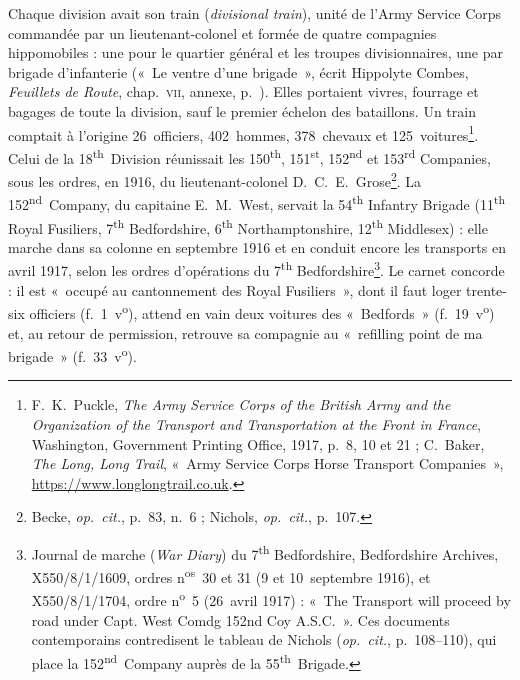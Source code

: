 Chaque division avait son train (\textit{divisional train}), unité de l'Army Service Corps commandée par un lieutenant-colonel et formée de quatre compagnies hippomobiles : une pour le quartier général et les troupes divisionnaires, une par brigade d'infanterie («~Le ventre d'une brigade~», écrit Hippolyte Combes, \textit{Feuillets de Route}, chap.~\textsc{vii}, annexe, p.~\pageref{annexe:doc6-vii}). Elles portaient vivres, fourrage et bagages de toute la division, sauf le premier échelon des bataillons. Un train comptait à l'origine 26~officiers, 402~hommes, 378~chevaux et 125~voitures\footnote{F.~K.~Puckle, \textit{The Army Service Corps of the British Army and the Organization of the Transport and Transportation at the Front in France}, Washington, Government Printing Office, 1917, p.~8, 10 et 21 ; C.~Baker, \textit{The Long, Long Trail}, «~Army Service Corps Horse Transport Companies~», \url{https://www.longlongtrail.co.uk}.}. Celui de la 18\textsuperscript{th}~Division réunissait les 150\textsuperscript{th}, 151\textsuperscript{st}, 152\textsuperscript{nd} et 153\textsuperscript{rd} Companies, sous les ordres, en 1916, du lieutenant-colonel D.~C.~E.~Grose\footnote{Becke, \textit{op.~cit.}, p.~83, n.~6 ; Nichols, \textit{op.~cit.}, p.~107.}. La 152\textsuperscript{nd}~Company, du capitaine E.~M.~West, servait la 54\textsuperscript{th} Infantry Brigade (11\textsuperscript{th} Royal Fusiliers, 7\textsuperscript{th} Bedfordshire, 6\textsuperscript{th} Northamptonshire, 12\textsuperscript{th} Middlesex) : elle marche dans sa colonne en septembre 1916 et en conduit encore les transports en avril 1917, selon les ordres d'opérations du 7\textsuperscript{th} Bedfordshire\footnote{Journal de marche (\textit{War Diary}) du 7\textsuperscript{th} Bedfordshire, Bedfordshire Archives, X550/8/1/1609, ordres n\textsuperscript{os}~30 et 31 (9 et 10~septembre 1916), et X550/8/1/1704, ordre n\textsuperscript{o}~5 (26~avril 1917) : «~The Transport will proceed by road under Capt. West Comdg 152nd Coy A.S.C.~». Ces documents contemporains contredisent le tableau de Nichols (\textit{op.~cit.}, p.~108--110), qui place la 152\textsuperscript{nd}~Company auprès de la 55\textsuperscript{th}~Brigade.}. Le carnet concorde : il est «~occupé au cantonnement des Royal Fusiliers~», dont il faut loger trente-six officiers (f.~1~v\textsuperscript{o}), attend en vain deux voitures des «~Bedfords~» (f.~19~v\textsuperscript{o}) et, au retour de permission, retrouve sa compagnie au «~refilling point de ma brigade~» (f.~33~v\textsuperscript{o}).

